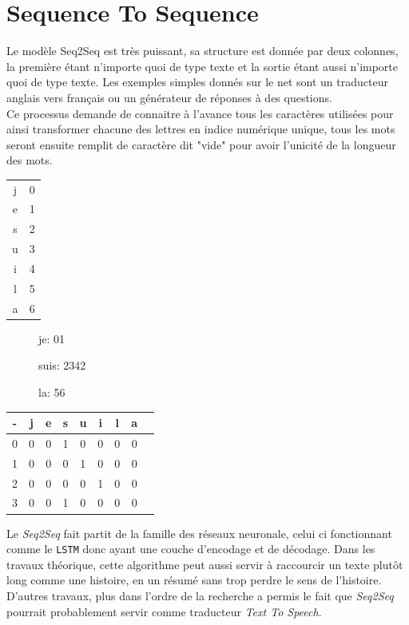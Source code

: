 \section{Sequence To Sequence}
Le modèle Seq2Seq est très puissant, sa structure est donnée par deux colonnes, la première étant n'importe quoi de type texte et la sortie étant aussi n'importe quoi de type texte. Les exemples simples donnés sur le net sont un traducteur anglais vers français ou un générateur de réponses à des questions.\\
\linebreak
Ce processus demande de connaitre à l'avance tous les caractères utilisées pour ainsi transformer chacune des lettres en indice numérique unique, tous les mots seront ensuite remplit de caractère dit "vide" pour avoir l'unicité de la longueur des mots.\\

\begin{multicols}{3}
\begin{tabular}{c|c}
j & 0\\
e & 1\\
s & 2\\
u & 3\\
i & 4\\
l & 5\\
a & 6\\
\end{tabular}
\begin{description}
\item[] je: 01
\item[] suis: 2342
\item[] la: 56
\end{description}
\begin{tabular}{c|cccccccc}
- & j & e & s & u & i & l & a\\
\hline
0 & 0 & 0 & 1 & 0 & 0 & 0 & 0\\
1 & 0 & 0 & 0 & 1 & 0 & 0 & 0\\
2 & 0 & 0 & 0 & 0 & 1 & 0 & 0\\
3 & 0 & 0 & 1 & 0 & 0 & 0 & 0\\
\end{tabular}
\end{multicols}

Le \textit{Seq2Seq} fait partit de la famille des réseaux neuronale, celui ci fonctionnant comme le \texttt{LSTM} donc ayant une couche d'encodage et de décodage.\linebreak
Dans les travaux théorique, cette algorithme peut aussi servir à raccourcir un texte plutôt long comme une histoire, en un résumé sans trop perdre le sens de l'histoire.\linebreak
D'autres travaux, plus dans l'ordre de la recherche a permis le fait que \textit{Seq2Seq} pourrait probablement servir comme traducteur \textit{Text To Speech}.

